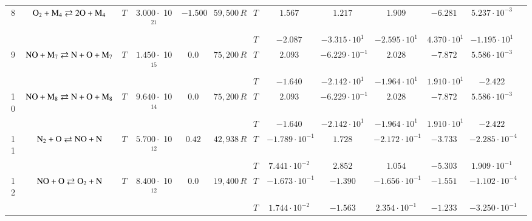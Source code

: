 \documentclass{warpdoc}
\begin{document}
\begin{table}[!ht]
\begin{center}
\begin{threeparttable}
\begin{tabular}{ccccccccccccc}
8 & $\rm O_2 + M_4 \rightleftarrows 2O+M_4$ &$T$ & $3.000 \cdot$ 10$^{21}$ & $-1.500$ & $59,500\, R$ 
                                          &$T$  & $1.567$  & $1.217$  & $1.909$ & $-6.281$ & $5.237 \cdot 10^{-3}$ & \multirow{2}{*}{\cite{ijhmt:2020:kim,ijhmt:2021:kim}} \\
 & & & & &                                &$T$  & $-2.087$  & $-3.315 \cdot 10^{1}$  & $-2.595 \cdot 10^{1}$ & $4.370 \cdot 10^{1}$ & $-1.195 \cdot 10^{1}$ & ~ \\
 
                                                                                   
9 & $\rm NO + M_7 \rightleftarrows N+O+M_7$ &$T$ & $1.450 \cdot$ 10$^{15}$ & $0.0$ & $75,200\, R$ 
                                          &$T$  & $2.093$  & $-6.229 \cdot 10^{-1}$  & $2.028$ & $-7.872$ & $5.586 \cdot 10^{-3}$ & \multirow{2}{*}{\cite{jpcrd:1991:tsang,ijhmt:2021:kim}} \\
 & & & & &                                &$T$  & $-1.640$  & $-2.142 \cdot 10^{1}$  & $-1.964 \cdot 10^{1}$ & $1.910 \cdot 10^{1}$ & $-2.422$ & ~ \\                                          
                                                                                    
10 & $\rm NO + M_8 \rightleftarrows N+O+M_8$ &$T$ & $9.640 \cdot$ 10$^{14}$ & $0.0$ & $75,200\, R$ 
                                          &$T$  & $2.093$  & $-6.229 \cdot 10^{-1}$  & $2.028$ & $-7.872$ & $5.586 \cdot 10^{-3}$ & \multirow{2}{*}{\cite{jpcrd:1991:tsang,ijhmt:2021:kim}} \\
 & & & & &                                &$T$  & $-1.640$  & $-2.142 \cdot 10^{1}$  & $-1.964 \cdot 10^{1}$ & $1.910 \cdot 10^{1}$ & $-2.422$ & ~ \\
 
                                                                                                           
11 & $\rm N_2 + O \rightleftarrows NO+N$ &$T$ & $5.700\cdot$ 10$^{12}$ & $0.42$ & $42,938\, R$ 
                                          &$T$  & $-1.789 \cdot 10^{-1}$  & $1.728$  & $-2.172 \cdot 10^{-1}$ & $-3.733$ & $-2.285 \cdot 10^{-4}$ & \multirow{2}{*}{\cite{jcp:1996:bose,ijhmt:2021:kim}} \\
 & & & & &                                &$T$  & $7.441 \cdot 10^{-2}$  & $2.852$  & $1.054$ & $-5.303$ & $1.909 \cdot 10^{-1}$ & ~ \\
 
                                          
12 & $\rm NO + O \rightleftarrows O_2+N$ &$T$ &  $8.400\cdot$ 10$^{12}$ & $0.0$ & $19,400\, R$ 
                                          &$T$  & $-1.673 \cdot 10^{-1}$  & $-1.390$  & $-1.656 \cdot 10^{-1}$ & $-1.551$ & $-1.102 \cdot 10^{-4}$ & \multirow{2}{*}{\cite{jcp:1997:bose,ijhmt:2021:kim}} \\
 & & & & &                                &$T$  & $1.744 \cdot 10^{-2}$  & $-1.563$  & $2.354 \cdot 10^{-1}$ & $-1.233$ & $-3.250 \cdot 10^{-1}$ & ~ \\
 

\end{tabular}
\end{threeparttable}
\end{center}
\end{table}
\end{document}
